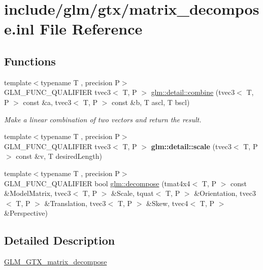 \hypertarget{matrix__decompose_8inl}{}\section{include/glm/gtx/matrix\+\_\+decompose.inl File Reference}
\label{matrix__decompose_8inl}
\subsection*{Functions}
\begin{DoxyCompactItemize}
\item 
\mbox{\label{matrix__decompose_8inl_ae1c6c18912ed1a03fc850bb11755213c}} 
{\footnotesize template$<$typename T , precision P$>$ }\\G\+L\+M\+\_\+\+F\+U\+N\+C\+\_\+\+Q\+U\+A\+L\+I\+F\+I\+ER tvec3$<$ T, P $>$ \hyperlink{matrix__decompose_8inl_ae1c6c18912ed1a03fc850bb11755213c}{glm\+::detail\+::combine} (tvec3$<$ T, P $>$ const \&a, tvec3$<$ T, P $>$ const \&b, T ascl, T bscl)
\begin{DoxyCompactList}\small\item\em Make a linear combination of two vectors and return the result. \end{DoxyCompactList}\item 
\mbox{\label{matrix__decompose_8inl_af47639907c02055dc95ef962e0ca9a02}} 
{\footnotesize template$<$typename T , precision P$>$ }\\G\+L\+M\+\_\+\+F\+U\+N\+C\+\_\+\+Q\+U\+A\+L\+I\+F\+I\+ER tvec3$<$ T, P $>$ {\bfseries glm\+::detail\+::scale} (tvec3$<$ T, P $>$ const \&v, T desired\+Length)
\item 
{\footnotesize template$<$typename T , precision P$>$ }\\G\+L\+M\+\_\+\+F\+U\+N\+C\+\_\+\+Q\+U\+A\+L\+I\+F\+I\+ER bool \hyperlink{group__gtx__matrix__decompose_ga0f1245817507156b337798a253577c8b}{glm\+::decompose} (tmat4x4$<$ T, P $>$ const \&Model\+Matrix, tvec3$<$ T, P $>$ \&Scale, tquat$<$ T, P $>$ \&Orientation, tvec3$<$ T, P $>$ \&Translation, tvec3$<$ T, P $>$ \&Skew, tvec4$<$ T, P $>$ \&Perspective)
\end{DoxyCompactItemize}


\subsection{Detailed Description}
\hyperlink{group__gtx__matrix__decompose}{G\+L\+M\+\_\+\+G\+T\+X\+\_\+matrix\+\_\+decompose} 